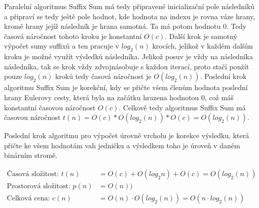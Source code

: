 \documentclass[12pt, a4paper]{article}
\begin{document}
Paralelní algoritmus Suffix Sum má tedy připravené inicializační pole následníků a připraví se tedy ještě pole hodnot, kde hodnota na indexu je rovna váze hrany, kromě hrany jejíž následník je hrana samotná. Ta má potom hodnotu 0. Tedy časová náročnost tohoto kroku je konstantní $O(c)$. Další krok je samotný výpočet sumy suffixů a ten pracuje v $log_{2}(n)$ krocích, jelikož v každém dalším kroku je možné využít výsledků následníka. Jelikož posuv je vždy na následníka následníka, tak se krok vždy zdvojnásobuje s každou iterací, proto stačí použít pouze $log_{2}(n)$ kroků tedy časová náročnost je $O(log_{2}(n))$. Poslední krok algoritmu Suffix Sum je korekční, kdy se přičte všem členům hodnota poslední hrany Eulerovy cesty, která byla na začátku hrazena hodnotou 0, což máš konstantní časovou náročnost $O(c)$. Celkově tedy algoritmus Suffix Sum má časovou náročnost $t(n)=O(c)*O(log_{2}(n))*O(c)=O(log_{2}(n))$.

Poslední krok algoritmu pro výpočet úrovně vrcholu je korekce výsledku, která přičte ke všem hodnotám vah jedničku a výsledkem toho je úroveň v daném binárním stromě.

\begin{equation}
\begin{split}
\text{Časová složitost: }t(n) &= O(c) + O(log_{2} n) + O(c) = O(log_{2}(n))\\
\text{Prostorová složitost: }p(n) &= O(n))\\
\text{Celková cena: }c(n) &= O(n) \cdot O(log_{2}(n)) = O(n\cdot log_{2}(n))
\end{split}
\end{equation}
\end{document}
